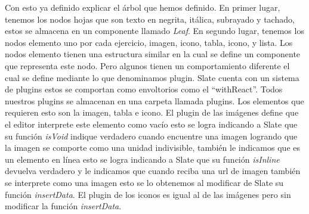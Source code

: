 Con esto ya definido explicar el árbol que hemos definido. En primer lugar, tenemos los nodos hojas que son texto en negrita, itálica, subrayado y tachado, estos se almacena en un componente llamado \textit{Leaf}. En segundo lugar, tenemos los nodos elemento uno por cada ejercicio, imagen, icono, tabla, icono, y lista. Los nodos elemento tienen una estructura similar en la cual se define un componente que representa este nodo. Pero algunos tienen un comportamiento diferente el cual se define mediante lo que denominamos plugin. Slate cuenta con un sistema de plugins estos se comportan como envoltorios como el ``withReact''. Todos nuestros plugins se almacenan en una carpeta llamada plugins. Los elementos que requieren esto son la imagen, tabla e icono. El plugin de las imágenes  define que el editor interprete este elemento como vacío esto se logra  indicando a Slate que su función \textit{isVoid} indique verdadero cuando encuentre una imagen logrando que la imagen se comporte como una unidad indivisible, también le indicamos que es un elemento en línea esto se logra indicando a Slate que su función \textit{isInline} devuelva verdadero y le indicamos que cuando reciba una url de imagen también se interprete como una imagen esto se lo obtenemos al modificar de Slate su función \textit{insertData}. El plugin de los iconos es igual al de las imágenes pero sin modificar la función \textit{insertData}.